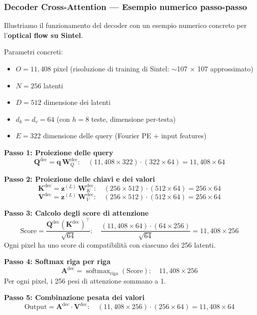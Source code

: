 \documentclass[12pt,a4paper]{article}
\begin{document}
\subsubsection{Decoder Cross-Attention --- Esempio numerico passo-passo}

Illustriamo il funzionamento del decoder con un esempio numerico concreto per l'\textbf{optical flow su Sintel}.

\begin{examplebox}
Parametri concreti:
\begin{itemize}
    \item $O = 11{,}408$ pixel (risoluzione di training di Sintel: $\sim$107 $\times$ 107 approssimato)
    \item $N = 256$ latenti
    \item $D = 512$ dimensione dei latenti
    \item $d_k = d_v = 64$ (con $h = 8$ teste, dimensione per-testa)
    \item $E = 322$ dimensione delle query (Fourier PE + input features)
\end{itemize}

\textbf{Passo 1: Proiezione delle query}
\[
\mathbf{Q}^{\text{dec}} = \mathbf{q} \, \mathbf{W}_Q^{\text{dec}}: \quad (11{,}408 \times 322) \cdot (322 \times 64) = 11{,}408 \times 64
\]

\textbf{Passo 2: Proiezione delle chiavi e dei valori}
\[
\mathbf{K}^{\text{dec}} = \mathbf{z}^{(L)} \, \mathbf{W}_K^{\text{dec}}: \quad (256 \times 512) \cdot (512 \times 64) = 256 \times 64
\]
\[
\mathbf{V}^{\text{dec}} = \mathbf{z}^{(L)} \, \mathbf{W}_V^{\text{dec}}: \quad (256 \times 512) \cdot (512 \times 64) = 256 \times 64
\]

\textbf{Passo 3: Calcolo degli score di attenzione}
\[
\text{Score} = \frac{\mathbf{Q}^{\text{dec}} (\mathbf{K}^{\text{dec}})^\top}{\sqrt{64}}: \quad \frac{(11{,}408 \times 64) \cdot (64 \times 256)}{\sqrt{64}} = 11{,}408 \times 256
\]
Ogni pixel ha uno score di compatibilit\`a con ciascuno dei 256 latenti.

\textbf{Passo 4: Softmax riga per riga}
\[
\mathbf{A}^{\text{dec}} = \operatorname{softmax}_{\text{riga}}(\text{Score}): \quad 11{,}408 \times 256
\]
Per ogni pixel, i 256 pesi di attenzione sommano a 1.

\textbf{Passo 5: Combinazione pesata dei valori}
\[
\text{Output} = \mathbf{A}^{\text{dec}} \cdot \mathbf{V}^{\text{dec}}: \quad (11{,}408 \times 256) \cdot (256 \times 64) = 11{,}408 \times 64
\]


\end{examplebox}
\end{document}
